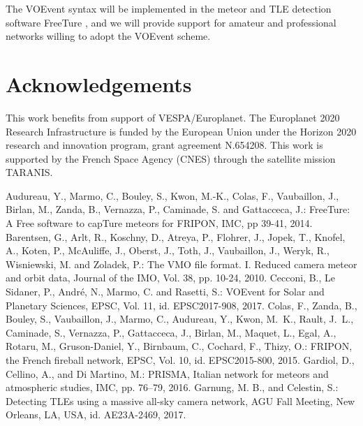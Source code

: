 \documentclass[10pt,twocolumn]{article}
\begin{document}
The VOEvent syntax will be implemented in the meteor and TLE detection software FreeTure \cite{freeture}, 
and we will provide support for amateur and professional networks willing to adopt the VOEvent scheme.
\newpage
\section*{Acknowledgements}
This work benefits from support of VESPA/Europlanet.
The Europlanet 2020 Research Infrastructure is funded by the European Union
under the Horizon 2020 research and innovation program, grant agreement N.654208.
This work is supported by the French Space Agency (CNES) through the satellite mission
TARANIS.
\begin{thebibliography}{}
\small
{}
Audureau, Y., Marmo, C., Bouley, S., Kwon, M.-K., Colas, F., Vaubaillon, J., Birlan, M., Zanda, B., Vernazza, P., Caminade, S. and Gattacceca, J.: FreeTure: A Free software to capTure meteors for FRIPON, IMC, pp 39-41, 2014.
Barentsen, G., Arlt, R., Koschny, D., Atreya, P., Flohrer, J., Jopek, T., Knofel, A., Koten, P., McAuliffe, J., Oberst, J., Toth, J., Vaubaillon, J., Weryk, R., Wisniewski, M. and Zoladek, P.: The VMO file format. I. Reduced camera meteor and orbit data, Journal of the IMO, Vol. 38, pp. 10-24, 2010.
Cecconi, B., Le Sidaner, P., Andr\'e, N., Marmo, C. and Rasetti, S.: VOEvent for Solar and Planetary Sciences, EPSC, Vol. 11, id. EPSC2017-908, 2017.
Colas, F., Zanda, B., Bouley, S., Vaubaillon, J., Marmo, C., Audureau, Y., Kwon, M.~K., Rault, J.~L., Caminade, S., Vernazza, P., Gattacceca, J., Birlan, M., Maquet, L., Egal, A., Rotaru, M., Gruson-Daniel, Y., Birnbaum, C., Cochard, F., Thizy, O.: FRIPON, the French fireball network, EPSC, Vol. 10, id. EPSC2015-800, 2015.
Gardiol, D., Cellino, A., and Di Martino, M.: PRISMA, Italian network for meteors and atmospheric studies, IMC, pp. 76–79, 2016.
Garnung, M. B., and Celestin, S.: Detecting TLEs using a massive all-sky camera network, AGU Fall Meeting, New Orleans, LA, USA, id. AE23A-2469, 2017.

\end{thebibliography}
\end{document}
